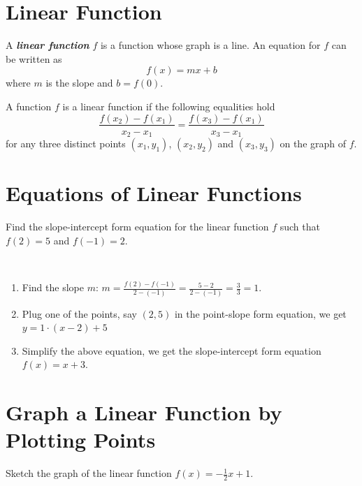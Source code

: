 \documentclass[
  en,11pt]{elegantbook}
\let\BeginKnitrBlock\begin \let\EndKnitrBlock\end
\begin{document}
\hypertarget{linear-function}{%
\section{Linear Function}\label{linear-function}}

A \textbf{\emph{linear function}} \(f\) is a function whose graph is a line. An equation for \(f\) can be written as
\[f(x) = mx + b\]
where \(m\) is the slope and \(b=f(0)\).

A function \(f\) is a linear function if the following equalities hold
\[
\dfrac{f(x_2)-f(x_1)}{x_2-x_1}
=\dfrac{f(x_3)-f(x_1)}{x_3-x_1}
\]
for any three distinct points \((x_1, y_1)\), \((x_2, y_2)\) and \((x_3, y_3)\) on the graph of \(f\).

\hypertarget{equations-of-linear-functions}{%
\section{Equations of Linear Functions}\label{equations-of-linear-functions}}

\BeginKnitrBlock{example}
\protect\hypertarget{exm:unnamed-chunk-234}{}{\label{exm:unnamed-chunk-234} }
Find the slope-intercept form equation for the linear function \(f\) such that \(f(2)=5\) and \(f(-1) = 2\).
\EndKnitrBlock{example}

\BeginKnitrBlock{solution}
{}\\

\begin{enumerate}
\def\labelenumi{\arabic{enumi}.}

\item
  Find the slope \(m\): \(m=\frac{f(2)-f(-1)}{2-(-1)}=\frac{5-2}{2-(-1)}=\frac{3}{3}=1\).
\item
  Plug one of the points, say \((2, 5)\) in the point-slope form equation, we get \(y=1\cdot(x-2)+5\)
\item
  Simplify the above equation, we get the slope-intercept form equation \(f(x)=x+3\).
\end{enumerate}
\EndKnitrBlock{solution}

\hypertarget{graph-a-linear-function-by-plotting-points}{%
\section{Graph a Linear Function by Plotting Points}\label{graph-a-linear-function-by-plotting-points}}

\BeginKnitrBlock{example}
\protect\hypertarget{exm:unnamed-chunk-236}{}{\label{exm:unnamed-chunk-236} }
Sketch the graph of the linear function \(f(x)=-\frac12 x + 1\).
\EndKnitrBlock{example}
\end{document}
